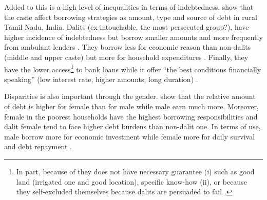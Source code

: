 \documentclass[a4paper, 11pt, onecolumn]{article}
\begin{document}


Added to this is a high level of inequalities in terms of indebtedness.
\cite{Guerin2013a} show that the caste affect borrowing strategies as amount, type and source of debt in rural Tamil Nadu, India.
Dalits (ex-intouchable, the most persecuted group?), have higher incidence of indebtedness but borrow smaller amounts and more frequently from ambulant lenders \citep{Guerin2013a}.
They borrow less for economic reason than non-dalits (middle and upper caste) but more for household expenditures \citep{Guerin2013a, Guerin2014a}.
Finally, they have the lower access\footnote{In part, because of they does not have necessary guarantee (i) such as good land (irrigated one and good location), specific know-how (ii), or because they self-excluded themselves because dalits are persuaded to fail \citep{Guerin2013a}.} to bank loans while it offer ``the best conditions financially speaking'' (low interest rate, higher amounts, long duration) \citep{Guerin2013a, Chavan2007}.

Disparities is also important through the gender.
\cite{Reboul2021} show that the relative amount of debt is higher for female than for male while male earn much more.
Moreover, female in the poorest households have the highest borrowing responsibilities and dalit female tend to face higher debt burdens than non-dalit one.
In terms of use, male borrow more for economic investment while female more for daily survival and debt repayment \citep{Reboul2021}.


\end{document}
